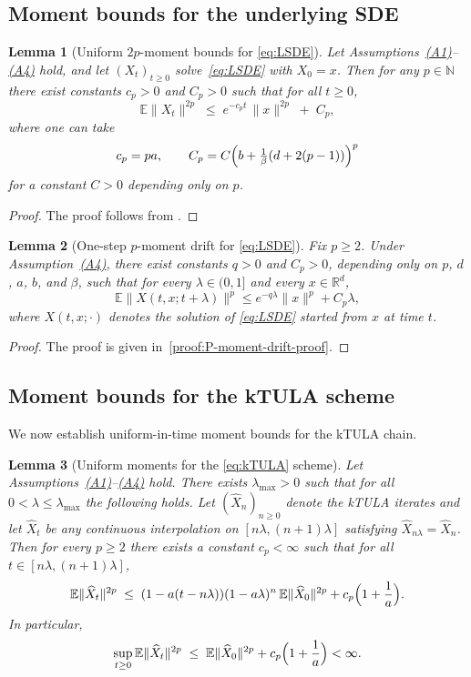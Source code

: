 \documentclass[11pt,a4paper,reqno]{amsart}
\theoremstyle{plain}
\newtheorem{lemma}{Lemma}
\theoremstyle{definition}
\theoremstyle{remark}
\newcommand{\E}{\mathbb{E}}
\begin{document}
\subsection{Moment bounds for the underlying SDE}
\begin{lemma}[Uniform $2p$-moment bounds for \ref{eq:LSDE}]
\label{lem:uniform-moments-sde}
Let Assumptions~\hyperref[ass:PJG]{\textup{(A1)}}--\hyperref[ass:D]{\textup{(A4)}} hold,
and let $(X_t)_{t\ge0}$ solve~\ref{eq:LSDE} with $X_0=x$.
Then for any $p\in\mathbb{N}$ there exist constants $c_p>0$ and $C_p>0$ such that
for all $t\ge0$,
\[
  \E\|X_t\|^{2p}
  \;\le\;
  e^{-c_p t}\,\|x\|^{2p}
  \;+\;
  C_p,
\]
where one can take
\[
  c_p = p a,
  \qquad
  C_p = C\Bigl(b + \tfrac{1}{\beta}(d+2(p-1))\Bigr)^p
\]
for a constant $C>0$ depending only on $p$.
\end{lemma}

\begin{proof}
The proof follows from \cite[Lemma A.1]{lim2023nonasymptoticestimatestuslaalgorithm}.
\end{proof}

\begin{lemma}[One-step \(p\)-moment drift for \ref{eq:LSDE}]
\label{lem:P-moment-drift}
Fix \(p\ge2\). Under Assumption~\hyperref[ass:D]{\textup{(A4)}}, there exist constants
\(q>0\) and \(C_p>0\), depending only on \(p\), \(d\), \(a\), \(b\), and \(\beta\), such that for every \(\lambda\in(0,1]\) and every
\(x\in\mathbb R^d\),
\[
\E\|X(t,x;t+\lambda)\|^p
\le
e^{-q\lambda}\|x\|^p + C_p\lambda,
\]
where $X(t,x;\cdot)$ denotes the solution of \eqref{eq:LSDE} started from $x$ at time $t$.
\end{lemma}

\begin{proof}
The proof is given in~\ref{proof:P-moment-drift-proof}.
\end{proof}


\subsection{Moment bounds for the kTULA scheme}

We now establish uniform-in-time moment bounds for the kTULA chain.

\begin{lemma}[Uniform moments for the \texorpdfstring{\eqref{eq:kTULA}}{kTULA} scheme]
\label{lem:moment-algorithm}
Let Assumptions~\hyperref[ass:PJG]{(A1)}--\hyperref[ass:D]{(A4)} hold.
There exists $\lambda_{\max}>0$ such that for all $0<\lambda\le\lambda_{\max}$ the following holds.
Let $(\widehat X_n)_{n\ge0}$ denote the kTULA iterates and let $\widehat X_t$ be any continuous
interpolation on $[n\lambda,(n+1)\lambda]$ satisfying $\widehat X_{n\lambda}=\widehat X_n$.
Then for every $p\ge2$ there exists a constant $c_p<\infty$ such that for all $t\in[n\lambda,(n+1)\lambda]$,
\[
  \E\|\widehat X_t\|^{2p}
  \;\le\;
  (1-a(t-n\lambda))(1-a\lambda)^n\,\E\|\widehat X_0\|^{2p}
  + c_p\Bigl(1+\frac{1}{a}\Bigr).
\]
In particular,
\[
  \sup_{t\ge0}\E\|\widehat X_t\|^{2p}
  \;\le\;
  \E\|\widehat X_0\|^{2p} + c_p\Bigl(1+\frac{1}{a}\Bigr)
  <\infty.
\]
\end{lemma}
\end{document}

